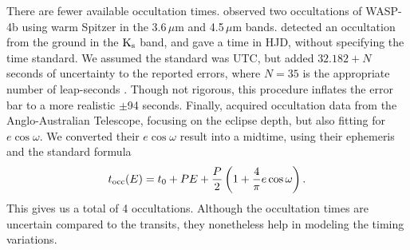 \documentclass[12pt,twocolumn,tighten]{aastex62}
\begin{document}

There are fewer available occultation times.
\citet{beerer_secondary_2011} observed two occultations of WASP-4b
using warm Spitzer in the 3.6\,$\mu$m and 4.5\,$\mu$m bands.
\citet{caceres_ground-based_2011} detected an occultation from the
ground in the ${\rm K}_{\rm s}$ band, and gave a time in HJD, without
specifying the time standard.  We assumed the standard was UTC, but
added $32.182 + N$ seconds of uncertainty to the reported errors,
where $N=35$ is the appropriate number of leap-seconds
\citep[see][]{eastman_achieving_2010}.
Though not rigorous, this procedure inflates the error bar to a more
realistic $\pm$94 seconds.
Finally, \citet{zhou_secondary_2015} acquired occultation data from
the Anglo-Australian Telescope, focusing on the eclipse depth, but
also fitting for $e\cos\omega$.  We converted their $e\cos\omega$
result into a midtime, using their ephemeris and the standard formula
\citep[{\it e.g.},][]{winn_exoplanet_2010}
\begin{equation}
  t_{\rm occ}(E) =
  t_0 +  P E  +
  \frac{P}{2} \left( 1 + \frac{4}{\pi} e\cos\omega \right).
  \label{eq:occultation_time}
\end{equation}
This gives us a total of 4 occultations.  Although the occultation
times are uncertain compared to the transits, they nonetheless help in
modeling the timing variations.
\end{document}

